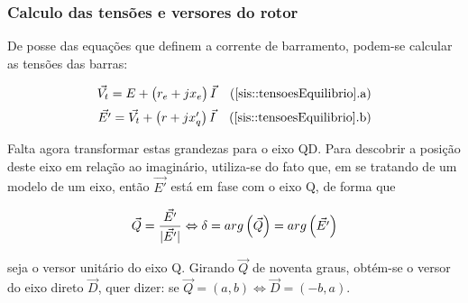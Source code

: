 \documentclass[10pt, compress,xcolor={svgnames,dvipsnames,x11names}]{beamer}
\begin{document}
\begin{frame}%
\frametitle{Calculo das tensões e versores do rotor}
\scriptsize

	De posse das equações que definem a corrente de barramento, podem-se calcular as tensões das barras:

\begin{align}
\begin{array}{cr}
	\vec{V_t} = E + \left(\strut r_e + jx_e\right)\vec{I} & \text{(\ref{sis::tensoesEquilibrio}.a)} \\[2mm]
	\vec{E'} = \vec{V_t} + \left(\strut r + jx'_q\right)\vec{I} & \text{(\ref{sis::tensoesEquilibrio}.b)}
\end{array}\label{sis::tensoesEquilibrio}
\end{align}

	Falta agora transformar estas grandezas para o eixo QD. Para descobrir a posição deste eixo em relação ao imaginário, utiliza-se do fato que, em se tratando de um modelo de um eixo, então $\vec{E'}$ está em fase com o eixo Q, de forma que

\begin{equation}
	\vec{Q} = \frac{\vec{E'}}{|\vec{E'}|} \Leftrightarrow 	\delta = arg\left(\strut \vec{Q}\right) = arg\left(\strut \vec{E'}\right) 
\end{equation}

seja o versor unitário do eixo Q. Girando $\vec{Q}$ de noventa graus, obtém-se o versor do eixo direto $\vec{D}$, quer dizer: se $\vec{Q} = (a,b) \Leftrightarrow \vec{D} = (-b,a)$.

\normalsize
\end{frame}%
\end{document}
